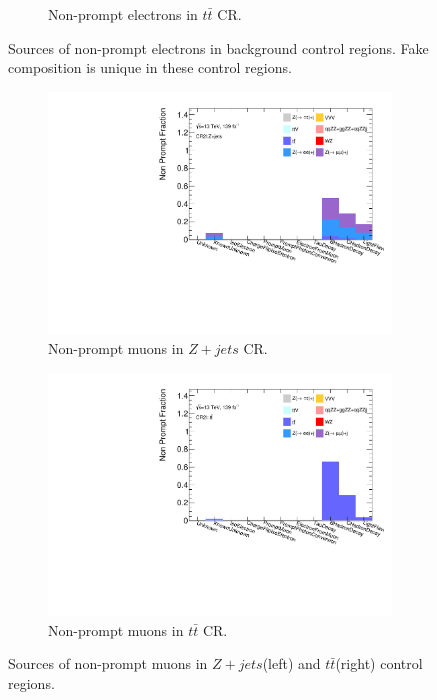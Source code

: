 \begin{figure}[ht]
\begin{subfigure}{.48\textwidth}
      \caption{Non-prompt electrons in $t\bar{t}$ CR.}
    \end{subfigure}
    \caption{Sources of non-prompt electrons in background control regions. Fake composition is unique in these control regions.\label{fig:FakeCompositionCR2LElectron}}
    \end{figure}

\begin{figure}[htb]
    \begin{subfigure}{.48\textwidth}
        \centering
        \includegraphics[width=.9\linewidth]{figures/Analysis/Background/NonPromptComposition_ZplusX_Muon.pdf}
        \caption{Non-prompt muons in $Z+jets$ CR.}
    \end{subfigure}
    \begin{subfigure}{.48\textwidth}
        \centering
        \includegraphics[width=.9\linewidth]{figures/Analysis/Background/NonPromptComposition_ttbar_Muons.pdf}
        \caption{Non-prompt muons in $t\bar{t}$ CR.}
    \end{subfigure}
        \caption{ Sources of non-prompt muons in $Z+jets$(left) and $t\bar{t}$(right) control regions.\label{fig:FakeCompositionCR2LMuon}}
\end{figure}

